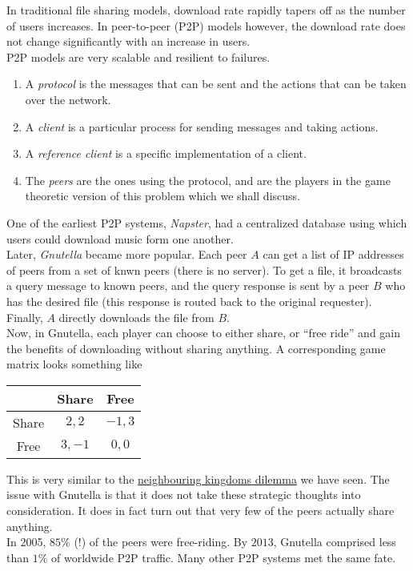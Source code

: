 		In traditional file sharing models, download rate rapidly tapers off as the number of users increases. In peer-to-peer (P2P) models however, the download rate does not change significantly with an increase in users.\\
		P2P models are very scalable and resilient to failures.
		\begin{enumerate}
			\item A \emph{protocol} is the messages that can be sent and the actions that can be taken over the network.
			\item A \emph{client} is a particular process for sending messages and taking actions.
			\item A \emph{reference client} is a specific implementation of a client.
			\item The \emph{peers} are the ones using the protocol, and are the players in the game theoretic version of this problem which we shall discuss.
		\end{enumerate}

		One of the earliest P2P systems, \emph{Napster}, had a centralized database using which users could download music form one another.\\
		Later, \emph{Gnutella} became more popular. Each peer $A$ can get a list of IP addresses of peers from a set of knwn peers (there is no server). To get a file, it broadcasts a query message to known peers, and the query response is sent by a peer $B$ who has the desired file (this response is routed back to the original requester). Finally, $A$ directly downloads the file from $B$.\\

		Now, in Gnutella, each player can choose to either share, or ``free ride'' and gain the benefits of downloading without sharing anything. A corresponding game matrix looks something like
		\begin{center}
		\begin{tabular}{|c||c|c|}
			\hline
			& \textsf{Share} & \textsf{Free} \\
			\hline\hline
			\textsf{Share} & $2,2$ & $-1,3$ \\
			\hline
			\textsf{Free} & $3,-1$ & $0,0$ \\
			\hline 
		\end{tabular}
		\end{center}

		This is very similar to the \href{ex: neighbouring kingdom dilemma}{neighbouring kingdoms dilemma} we have seen. The issue with Gnutella is that it does not take these strategic thoughts into consideration. It does in fact turn out \cite{gnutella-free-ride} that very few of the peers actually share anything.\\
		In 2005, $85\%$ (!) of the peers were free-riding. By $2013$, Gnutella comprised less than $1\%$ of worldwide P2P traffic. Many other P2P systems met the same fate.\\

